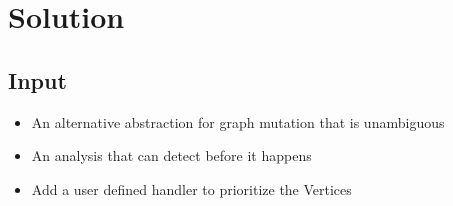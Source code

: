 \section{Solution}
\subsection{Input}
\begin{frame}
\begin{itemize}
  \item An alternative abstraction for graph mutation that is unambiguous
  \item An analysis that can detect before it happens
  \item Add a user defined handler to prioritize the Vertices
\end{itemize}
\end{frame}

